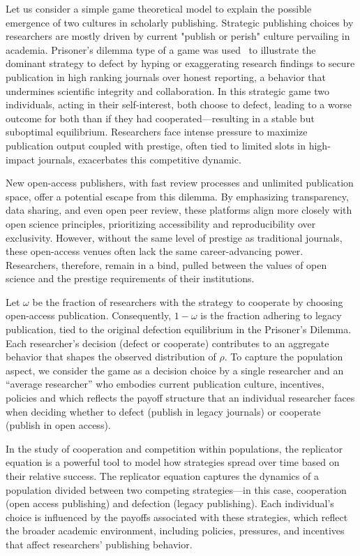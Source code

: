 \documentclass[amsfonts, amssymb, prl, superscriptaddress, notitlepage, twocolumn, nofootinbib]{revtex4-2}
\begin{document}
Let us consider a simple game theoretical model to explain the possible emergence of two cultures in scholarly publishing.
Strategic publishing choices by researchers are mostly driven by current "publish or perish" culture pervailing in academia. Prisoner’s dilemma type of a game was used~\cite{publish-and-flourish_2019,erren_analyzing_2016} to illustrate the dominant strategy to defect by hyping or exaggerating research findings to secure publication in high ranking journals over honest reporting, a behavior that undermines scientific integrity and collaboration. In this strategic game two individuals, acting in their self-interest, both choose to defect, leading to a worse outcome for both than if they had cooperated—resulting in a stable but suboptimal equilibrium. Researchers face intense pressure to maximize publication output coupled with prestige, often tied to limited slots in high-impact journals, exacerbates this competitive dynamic.

New open-access publishers, with fast review processes and unlimited publication space, offer a potential escape from this dilemma. By emphasizing transparency, data sharing, and even open peer review, these platforms align more closely with open science principles, prioritizing accessibility and reproducibility over exclusivity. However, without the same level of prestige as traditional journals, these open-access venues often lack the same career-advancing power. Researchers, therefore, remain in a bind, pulled between the values of open science and the prestige requirements of their institutions.

Let $\omega$ be the fraction of researchers with the strategy to cooperate by choosing open-access publication. Consequently, $1 - \omega$ is the fraction adhering to legacy publication, tied to the original defection equilibrium in the Prisoner’s Dilemma. Each researcher’s decision (defect or cooperate) contributes to an aggregate behavior that shapes the observed distribution of $\rho$. To capture the population aspect, we consider the game as a decision choice by a single researcher and an “average researcher” who embodies current publication culture, incentives, policies and which reflects the payoff structure that an individual researcher faces when deciding whether to defect (publish in legacy journals) or cooperate (publish in open access). 

In the study of cooperation and competition within populations, the replicator equation is a powerful tool to model how strategies spread over time based on their relative success. The replicator equation captures the dynamics of a population divided between two competing strategies—in this case, cooperation (open access publishing) and defection (legacy publishing). Each individual’s choice is influenced by the payoffs associated with these strategies, which reflect the broader academic environment, including policies, pressures, and incentives that affect researchers' publishing behavior.
\end{document}
